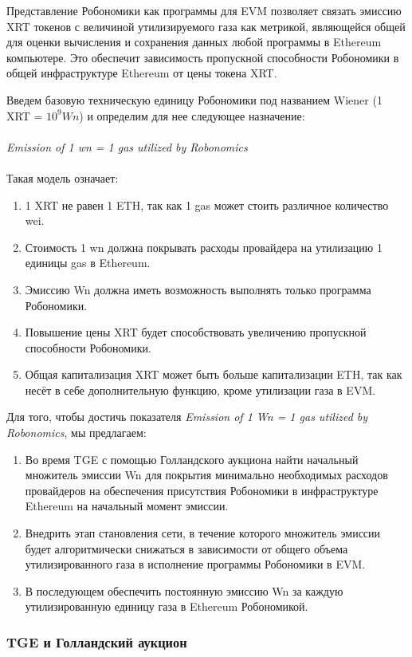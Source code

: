 \documentclass{article}
\begin{document}
Представление Робономики как программы для EVM позволяет связать эмиссию XRT токенов с величиной утилизируемого газа как метрикой, являющейся общей для оценки вычисления и сохранения данных любой программы в Ethereum компьютере. Это обеспечит зависимость пропускной способности Робономики в общей инфраструктуре Ethereum от цены токена XRT.

Введем базовую техническую единицу Робономики под названием Wiener (1 XRT = $10^9 Wn$) и определим для нее следующее назначение:
\\
\\
\textit{Emission of 1 wn = 1 gas utilized by Robonomics}
\\
\\
Такая модель означает:
\begin{enumerate}
	\item 1 XRT не равен 1 ETH, так как 1 gas может стоить различное количество wei.
	\item Стоимость 1 wn должна покрывать расходы провайдера на утилизацию 1 единицы gas в Ethereum.
	\item Эмиссию Wn должна иметь возможность выполнять только программа Робономики.
	\item Повышение цены XRT будет способствовать увеличению пропускной способности Робономики.
	\item Общая капитализация XRT может быть больше капитализации ETH, так как несёт в себе дополнительную функцию, кроме утилизации газа в EVM.
\end{enumerate}

Для того, чтобы достичь показателя \textit{Emission of 1 Wn = 1 gas utilized by Robonomics}, мы предлагаем:
\begin{enumerate}
	\item Во время TGE с помощью Голландского аукциона найти начальный множитель эмиссии Wn для покрытия минимально необходимых расходов провайдеров на обеспечения присутствия Робономики в инфраструктуре Ethereum на начальный момент эмиссии. 
	\item Внедрить этап становления сети, в течение которого множитель эмиссии будет алгоритмически снижаться в зависимости от общего объема утилизированного газа в исполнение программы Робономики в EVM.
	\item В последующем обеспечить постоянную эмиссию Wn за каждую утилизированную единицу газа в Ethereum Робономикой. 
\end{enumerate}

\subsubsection{TGE и Голландский аукцион}
\end{document}
